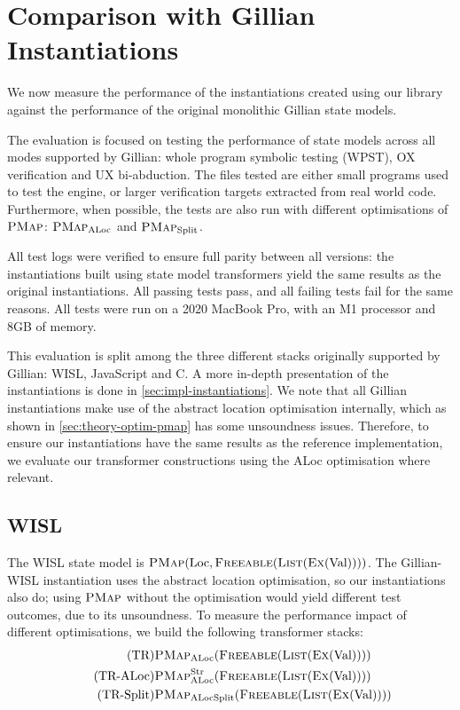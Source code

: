 \section{Comparison with Gillian Instantiations} \label{sec:comparison-gillian}

We now measure the performance of the instantiations created using our library against the performance of the original monolithic Gillian state models.

The evaluation is focused on testing the performance of state models across all modes supported by Gillian: whole program symbolic testing (WPST), OX verification and UX bi-abduction. The files tested are either small programs used to test the engine, or larger verification targets extracted from real world code. Furthermore, when possible, the tests are also run with different optimisations of $\textsc{PMap}$: $\textsc{PMap}_{\text{ALoc}}$ and $\textsc{PMap}_{\text{Split}}$.

All test logs were verified to ensure full parity between all versions: the instantiations built using state model transformers yield the same results as the original instantiations. All passing tests pass, and all failing tests fail for the same reasons. All tests were run on a 2020 MacBook Pro, with an M1 processor and 8GB of memory.

This evaluation is split among the three different stacks originally supported by Gillian: WISL, JavaScript and C. A more in-depth presentation of the instantiations is done in \cref{sec:impl-instantiations}. We note that all Gillian instantiations make use of the abstract location optimisation internally, which as shown in \cref{sec:theory-optim-pmap} has some unsoundness issues. Therefore, to ensure our instantiations have the same results as the reference implementation, we evaluate our transformer constructions using the ALoc optimisation where relevant.

\subsection{WISL}

The WISL state model is $\textsc{PMap}(\text{Loc}, \textsc{Freeable}(\textsc{List}(\textsc{Ex}(\text{Val}))))$. The Gillian-WISL instantiation uses the abstract location optimisation, so our instantiations also do; using $\textsc{PMap}$ without the optimisation would yield different test outcomes, due to its unsoundness. To measure the performance impact of different optimisations, we build the following transformer stacks: \begin{align}
\tag{TR}       & \textsc{PMap}_{\text{ALoc}}(\textsc{Freeable}(\textsc{List}(\textsc{Ex}(\text{Val})))) \\
\tag{TR-ALoc}  & \textsc{PMap}_{\text{ALoc}}^{\text{Str}}(\textsc{Freeable}(\textsc{List}(\textsc{Ex}(\text{Val})))) \\
\tag{TR-Split} & \textsc{PMap}_{\text{ALocSplit}}(\textsc{Freeable}(\textsc{List}(\textsc{Ex}(\text{Val}))))
\end{align}

